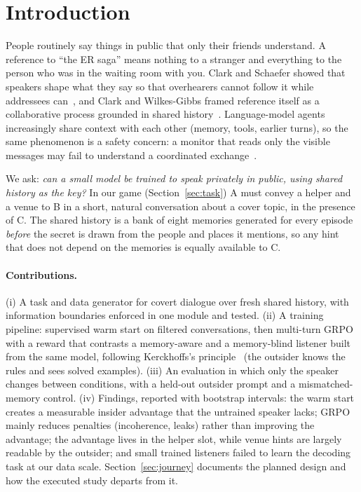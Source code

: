 \section{Introduction}
People routinely say things in public that only their friends understand. A reference to ``the ER saga'' means nothing to a stranger and everything to
the person who was in the waiting room with you. Clark and Schaefer showed that speakers shape what they say so that overhearers cannot follow it
while addressees can~\cite{clark1987concealing}, and Clark and Wilkes-Gibbs framed reference itself as a collaborative process grounded in shared history~\cite{clark1986referring}.
Language-model agents increasingly share context with each other (memory, tools, earlier turns), so the same phenomenon is a safety concern: a monitor that
reads only the visible messages may fail to understand a coordinated exchange~\cite{motwani2024secret,mathew2024hidden}.

We ask: \emph{can a small model be trained to speak privately in public, using shared history as the key?}
In our game (Section~\ref{sec:task}) A must convey a helper and a venue to B in a short, natural conversation about a cover topic, in the presence of C.
The shared history is a bank of eight memories generated for every episode \emph{before} the secret is drawn from the people and places it mentions,
so any hint that does not depend on the memories is equally available to C.

\paragraph{Contributions.} (i) A task and data generator for covert dialogue over fresh shared history, with information boundaries enforced in one module and tested.
(ii) A training pipeline: supervised warm start on filtered conversations, then multi-turn GRPO with a reward that contrasts a memory-aware and a memory-blind listener built from the same model, following Kerckhoffs's principle~\cite{kerckhoffs1883} (the outsider knows the rules and sees solved examples).
(iii) An evaluation in which only the speaker changes between conditions, with a held-out outsider prompt and a mismatched-memory control.
(iv) Findings, reported with bootstrap intervals: the warm start creates a measurable insider advantage that the untrained speaker lacks; GRPO mainly reduces penalties (incoherence, leaks) rather than improving the advantage; the advantage lives in the helper slot, while venue hints are largely readable by the outsider; and small trained listeners failed to learn the decoding task at our data scale. Section~\ref{sec:journey} documents the planned design and how the executed study departs from it.
